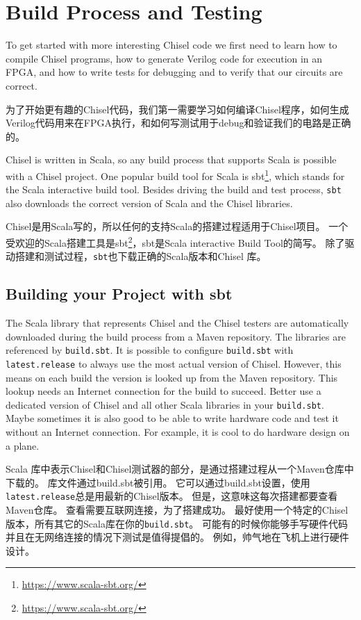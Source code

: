 \documentclass[%
    10pt,
    headinclude, footexclude,
    openright, %
    notitlepage,
    cleardoubleempty,
    headsepline,
    pointlessnumbers,
    bibtotoc, idxtotoc,
    ]{scrbook}
\newcommand{\code}[1]{{\small{\texttt{#1}}}}
\newcommand{\myref}[2]{\href{#1}{#2}}
\renewcommand{\myref}[2]{{#2}{\footnote{\url{#1}}}}
\begin{document}
\chapter{Build Process and Testing}

To get started with more interesting Chisel code we first need to learn how to compile
Chisel programs, how to generate Verilog code for execution in an FPGA, and how
to write tests for debugging and to verify that our circuits are correct.

为了开始更有趣的Chisel代码，我们第一需要学习如何编译Chisel程序，如何生成Verilog代码用来在FPGA执行，和如何写测试用于debug和验证我们的电路是正确的。


Chisel is written in Scala, so any build process that supports Scala is possible
with a Chisel project. One popular build tool for Scala is \myref{https://www.scala-sbt.org/}{sbt},
which stands for the Scala interactive build tool.
Besides driving the build and test process, \code{sbt} also downloads the correct
version of Scala and the Chisel libraries.

Chisel是用Scala写的，所以任何的支持Scala的搭建过程适用于Chisel项目。
一个受欢迎的Scala搭建工具是\myref{https://www.scala-sbt.org/}{sbt}，sbt是Scala interactive Build Tool的简写。
除了驱动搭建和测试过程，\code{sbt}也下载正确的Scala版本和Chisel 库。


\section{Building your Project with sbt}

The Scala library that represents Chisel and the Chisel testers are automatically
downloaded during the build process from a Maven repository.
The libraries are referenced by \code{build.sbt}. It is possible to configure \code{build.sbt}
with \code{latest.release} to always use the most actual version of Chisel.
However, this means on each build the version is looked up from the Maven
repository. This lookup needs an Internet connection for the build to succeed.
Better use a dedicated version of Chisel and all other Scala libraries in your \code{build.sbt}.
Maybe sometimes it is also good to be able to write hardware code and test it without an Internet connection.
For example, it is cool to do hardware design on a plane.

Scala 库中表示Chisel和Chisel测试器的部分，是通过搭建过程从一个Maven仓库中下载的。
库文件通过build.sbt被引用。
它可以通过build.sbt设置，使用\code{latest.release}总是用最新的Chisel版本。
但是，这意味这每次搭建都要查看Maven仓库。
查看需要互联网连接，为了搭建成功。
最好使用一个特定的Chisel版本，所有其它的Scala库在你的\code{build.sbt}。
可能有的时候你能够手写硬件代码并且在无网络连接的情况下测试是值得提倡的。
例如，帅气地在飞机上进行硬件设计。
\end{document}
